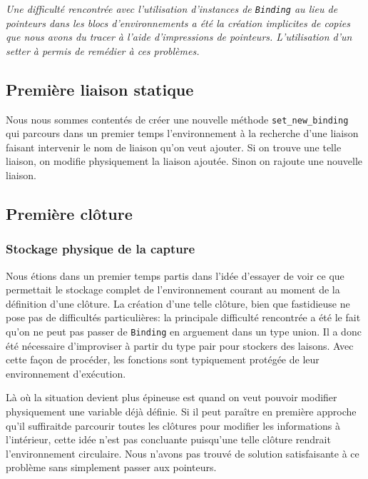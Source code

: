 \documentclass[a4paper,11pt]{article}
\newcommand{\dbend}{{\manual\char127}}
\newenvironment{attention}%
{\description\item[\dbend]\sl}%
{\enddescription}
\begin{document}
\begin{attention}
  Une difficulté rencontrée avec l'utilisation d'instances de \texttt{Binding}
  au lieu de pointeurs dans les blocs d'environnements a été la création
  implicites de copies que nous avons du tracer à l'aide d'impressions de
  pointeurs. L'utilisation d'un setter à permis de remédier à ces problèmes.
\end{attention}

\subsection{Première liaison statique}

Nous nous sommes contentés de créer une nouvelle méthode
\texttt{set\_new\_binding} qui parcours dans un premier temps l'environnement à la
recherche d'une liaison faisant intervenir le nom de liaison qu'on veut ajouter.
Si on trouve une telle liaison, on modifie physiquement la liaison ajoutée.
Sinon on rajoute une nouvelle liaison.

\subsection{Première clôture}

\subsubsection{Stockage physique de la capture}

Nous étions dans un
premier temps partis dans l'idée d'essayer de voir ce que permettait le stockage complet de
l'environnement courant au moment de la définition d'une clôture. La création
d'une telle clôture, bien que fastidieuse ne pose pas de difficultés
particulières: la principale difficulté rencontrée a été le fait qu'on ne peut
pas passer de \texttt{Binding} en arguement dans un type union. Il a donc été
nécessaire d'improviser à partir du type pair pour stockers des laisons. Avec
cette façon de procéder, les fonctions sont typiquement protégée de leur
environnement d'exécution.

Là où la situation devient plus épineuse est quand on veut pouvoir modifier
physiquement une variable déjà définie. Si il peut paraître en première approche
qu'il \og suffirait\fg de parcourir toutes les clôtures pour modifier les
informations à l'intérieur, cette idée n'est pas concluante  puisqu'une telle clôture
rendrait l'environnement circulaire. Nous n'avons pas trouvé de solution
satisfaisante à ce problème sans simplement passer aux pointeurs.
\end{document}
